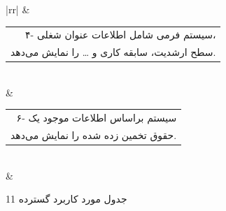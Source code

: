 \documentclass[12pt]{article}
\begin{document}
\begin{center}
\begin{table}[H]
\begin{tabular}{|rr|}
			                          & \begin{tabular}[c]{@{}r@{}}۴- سیستم فرمی شامل اطلاعات عنوان شغلی، \\ سطح ارشدیت، سابقه کاری و … را نمایش می‌دهد.\end{tabular} \\ \hline
			 & \begin{tabular}[c]{@{}r@{}}۶- سیستم براساس اطلاعات موجود یک \\ حقوق تخمین زده شده را نمایش می‌دهد.\end{tabular}               \\ \hline
			                   &                                                                                                          \\ \hline

		\end{tabular}
	\end{table}

	\begin{table}[H]
		\caption{جدول مورد کاربرد گسترده 11}
		\label{tab:ext-uc11}


\end{table}
\end{center}
\end{document}
